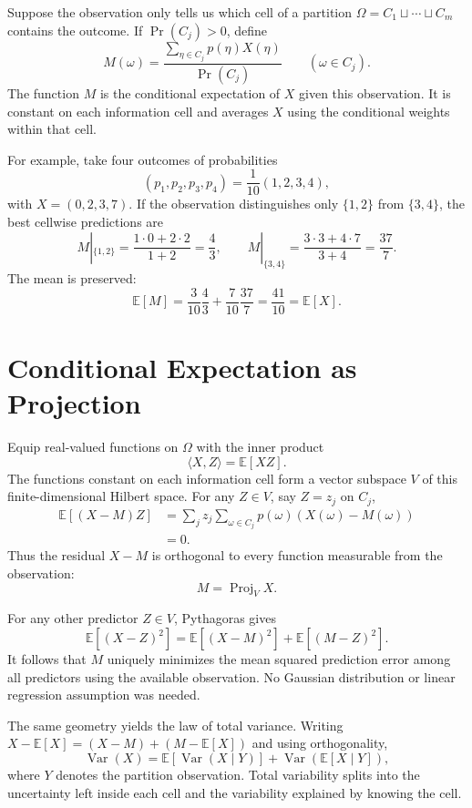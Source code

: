 Suppose the observation only tells us which cell of a partition
\(\Omega=C_1\sqcup\cdots\sqcup C_m\) contains the outcome. If \(\Pr(C_j)>0\), define
\[
 M(\omega)=\frac{\sum_{\eta\in C_j}p(\eta)X(\eta)}
                  {\Pr(C_j)}
 \qquad(\omega\in C_j).
\]
The function \(M\) is the conditional expectation of \(X\) given this observation. It is constant on each information cell and averages \(X\) using the conditional weights within that cell.

For example, take four outcomes of probabilities
\[
 (p_1,p_2,p_3,p_4)=\frac1{10}(1,2,3,4),
\]
with \(X=(0,2,3,7)\). If the observation distinguishes only \(\{1,2\}\) from \(\{3,4\}\), the best cellwise predictions are
\[
 M|_{\{1,2\}}=\frac{1\cdot0+2\cdot2}{1+2}=\frac43,
 \qquad
 M|_{\{3,4\}}=\frac{3\cdot3+4\cdot7}{3+4}=\frac{37}{7}.
\]
The mean is preserved:
\[
 \mathbb E[M]
 =\frac3{10}\frac43+\frac7{10}\frac{37}{7}
 =\frac{41}{10}=\mathbb E[X].
\]

\section{Conditional Expectation as Projection}

Equip real-valued functions on \(\Omega\) with the inner product
\[
 \langle X,Z\rangle=\mathbb E[XZ].
\]
The functions constant on each information cell form a vector subspace \(V\) of this finite-dimensional Hilbert space. For any \(Z\in V\), say \(Z=z_j\) on \(C_j\),
\[
\begin{aligned}
 \mathbb E[(X-M)Z]
 &=\sum_jz_j\sum_{\omega\in C_j}
       p(\omega)(X(\omega)-M(\omega))\\
 &=0.
\end{aligned}
\]
Thus the residual \(X-M\) is orthogonal to every function measurable from the observation:
\[
 \boxed{M=\operatorname{Proj}_V X.}
\]

For any other predictor \(Z\in V\), Pythagoras gives
\[
 \mathbb E[(X-Z)^2]
 =\mathbb E[(X-M)^2]+\mathbb E[(M-Z)^2].
\]
It follows that \(M\) uniquely minimizes the mean squared prediction error among all predictors using the available observation. No Gaussian distribution or linear regression assumption was needed.

The same geometry yields the law of total variance. Writing \(X-\mathbb E[X]=(X-M)+(M-\mathbb E[X])\) and using orthogonality,
\[
 \boxed{\operatorname{Var}(X)
 =\mathbb E[\operatorname{Var}(X\mid Y)]
  +\operatorname{Var}(\mathbb E[X\mid Y]),}
\]
where \(Y\) denotes the partition observation. Total variability splits into the uncertainty left inside each cell and the variability explained by knowing the cell.

